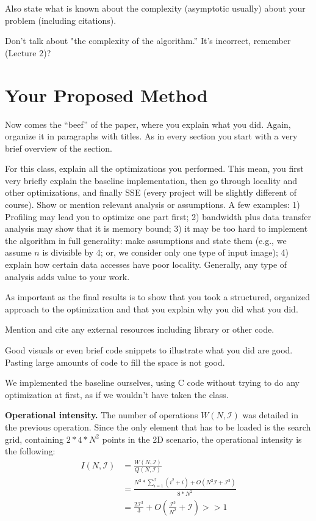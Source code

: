\documentclass[letterpaper]{article}
\newcommand{\mypar}[1]{{\bf #1.}}
\begin{document}
Also state what is
known about the complexity (asymptotic usually) 
about your problem (including citations).

Don't talk about "the complexity of the algorithm.'' It's incorrect,
remember (Lecture 2)?


\section{Your Proposed Method}\label{sec:yourmethod}

Now comes the ``beef'' of the paper, where you explain what you
did. Again, organize it in paragraphs with titles. As in every section
you start with a very brief overview of the section.

For this class, explain all the optimizations you performed. This mean, you first very briefly
explain the baseline implementation, then go through locality and other optimizations, and finally SSE (every project will be slightly different of course). Show or mention relevant analysis or assumptions. A few examples: 1) Profiling may lead you to optimize one part first; 2) bandwidth plus data transfer analysis may show that it is memory bound; 3) it may be too hard to implement the algorithm in full generality: make assumptions and state them (e.g., we assume $n$ is divisible by 4; or, we consider only one type of input image); 4) explain how certain data accesses have poor locality. Generally, any type of analysis adds value to your work.

As important as the final results is to show that you took a structured, organized approach to the optimization and that you explain why you did what you did.

Mention and cite any external resources including library or other code.

Good visuals or even brief code snippets to illustrate what you did are good. Pasting large amounts of code to fill the space is not good.

We implemented the baseline ourselves, using C code without trying to do any optimization at first, as if we wouldn't have taken the class.

\mypar{Operational intensity} The number of operations $W(N, \mathcal{I})$ was detailed in the previous operation. Since the only element that has to be loaded is the search grid, containing $2 * 4 * N^2$ points in the 2D scenario, the operational intensity is the following:
\begin{align*}
    I(N, \mathcal{I}) &= \frac{W(N, \mathcal{I})}{Q(N, \mathcal{I})} \\
    &= \frac{N^2*\sum_{i=1}^\mathcal{I}(i^2+i)+O(N^2\mathcal{I}+\mathcal{I}^3)}{8*N^2}\\
    &= \frac{2\mathcal{I}^3}{3}+O\left(\frac{\mathcal{I}^3}{N^2}+\mathcal{I}\right) >> 1
\end{align*}
\end{document}
